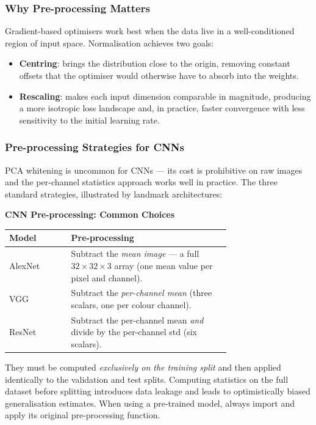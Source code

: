 \documentclass[11pt,a4paper]{article}
\begin{document}
\subsubsection{Why Pre-processing Matters}

Gradient-based optimisers work best when the data live in a well-conditioned region of input space. Normalisation achieves two goals:
\begin{itemize}
  \item \textbf{Centring}: brings the distribution close to the origin, removing constant offsets that the optimiser would otherwise have to absorb into the weights.
  \item \textbf{Rescaling}: makes each input dimension comparable in magnitude, producing a more isotropic loss landscape and, in practice, faster convergence with less sensitivity to the initial learning rate.
\end{itemize}

\subsubsection{Pre-processing Strategies for CNNs}

PCA whitening is uncommon for CNNs — its cost is prohibitive on raw images and the per-channel statistics approach works well in practice. The three standard strategies, illustrated by landmark architectures:

\begin{tcolorbox}[colback=LightBlue,colframe=AccentBlue,boxrule=0.8pt,arc=3pt]
\textbf{CNN Pre-processing: Common Choices}\\[4pt]
\begin{tabular}{@{}lp{0.72\linewidth}@{}}
\toprule
\textbf{Model} & \textbf{Pre-processing} \\
\midrule
AlexNet & Subtract the \emph{mean image} — a full $32\times32\times3$ array (one mean value per pixel and channel). \\
VGG     & Subtract the \emph{per-channel mean} (three scalars, one per colour channel). \\
ResNet  & Subtract the per-channel mean \emph{and} divide by the per-channel std (six scalars). \\
\bottomrule
\end{tabular}
\end{tcolorbox}

\begin{warnbox}
They must be computed \emph{exclusively on the training split} and then applied identically to the validation and test splits. Computing statistics on the full dataset before splitting introduces data leakage and leads to optimistically biased generalisation estimates. When using a pre-trained model, always import and apply its original pre-processing function.
\end{warnbox}
\end{document}
